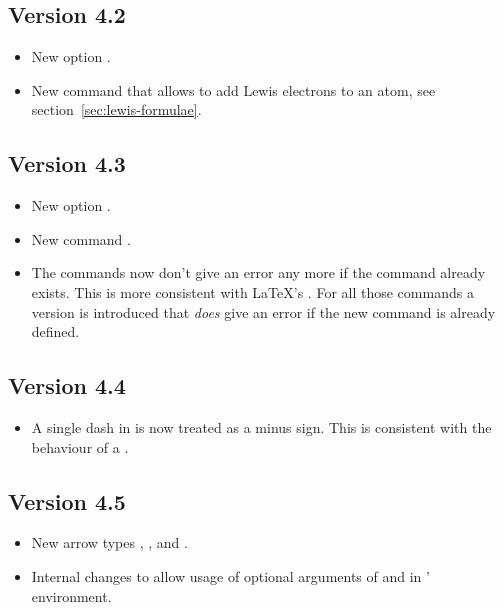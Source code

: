 \documentclass[load-preamble+]{cnltx-doc}
\begin{document}
\subsection{Version 4.2}
\begin{itemize}
  \item New option .
  \item New command  that allows to add Lewis electrons to an
    atom, see section~\ref{sec:lewis-formulae}.
\end{itemize}

\subsection{Version 4.3}
\begin{itemize}
  \item New option .
  \item New command .
  \item The commands  now don't give an error any
    more if the command already exists.  This is more consistent with \LaTeX's
    .  For all those commands a version
     is introduced that \emph{does} give an error if
    the new command is already defined.
\end{itemize}

\subsection{Version 4.4}
\begin{itemize}
  \item A single dash \code{-} in  is now treated as a minus sign.
  This is consistent with the behaviour of a \code{+}.
\end{itemize}

\subsection{Version 4.5}
\begin{itemize}
  \item New arrow types \arrowtype{>=<}, \arrowtype{>=<<}, \arrowtype{>>=<}
    and \arrowtype{<==>}.
  \item Internal changes to  allow usage of optional arguments of
    \cs*{\textbackslash} and  in \chemmacros' 
    environment.
\end{itemize}
\end{document}
